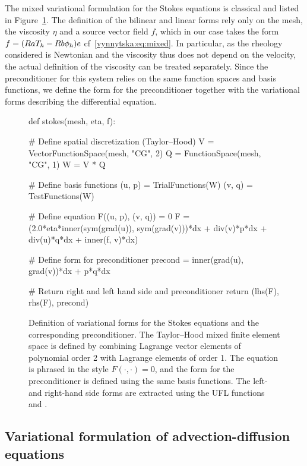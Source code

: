 The mixed variational formulation for the Stokes equations is
classical and listed in Figure~\ref{vynnytska:fig:stokes}. The
definition of the bilinear and linear forms rely only on the mesh, the
viscosity $\eta$ and a source vector field $f$, which in our case
takes the form $f = (Ra T_h - Rb \phi_h) e$
cf~\eqref{vynnytska:eq:mixed}. In particular, as the rheology
considered is Newtonian and the viscosity thus does not depend on the
velocity, the actual definition of the viscosity can be treated
separately. Since the preconditioner for this system relies on the
same function spaces and basis functions, we define the form for the
preconditioner together with the variational forms describing the
differential equation.
\begin{figure}
  \begin{python}
def stokes(mesh, eta, f):

    # Define spatial discretization (Taylor--Hood)
    V = VectorFunctionSpace(mesh, "CG", 2)
    Q = FunctionSpace(mesh, "CG", 1)
    W = V * Q

    # Define basis functions
    (u, p) = TrialFunctions(W)
    (v, q) = TestFunctions(W)

    # Define equation F((u, p), (v, q)) = 0
    F = (2.0*eta*inner(sym(grad(u)), sym(grad(v)))*dx
         + div(v)*p*dx
         + div(u)*q*dx
         + inner(f, v)*dx)

    # Define form for preconditioner
    precond = inner(grad(u), grad(v))*dx + p*q*dx

    # Return right and left hand side and preconditioner
    return (lhs(F), rhs(F), precond)
  \end{python}
  \caption{Definition of variational forms for the Stokes equations
    and the corresponding preconditioner. The Taylor--Hood mixed
    finite element space is defined by combining Lagrange vector
    elements of polynomial order 2 with Lagrange elements of order
    1. The equation is phrased in the style $F(\cdot, \cdot) = 0$, and
    the form for the preconditioner is defined using the same basis
    functions. The left- and right-hand side forms are extracted using
    the UFL functions  and .}
  \label{vynnytska:fig:stokes}
\end{figure}

\subsection{Variational formulation of advection-diffusion equations}


